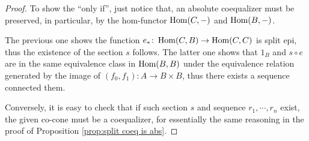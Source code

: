   \begin{proof}
    To show the ``only if'', just notice that, an absolute coequalizer must be preserved, in particular, by the hom-functor $\operatorname{Hom}(C,-)$ and $\operatorname{Hom}(B,-)$.

    The previous one shows the function $e_{\ast}\colon\operatorname{Hom}(C,B)\to\operatorname{Hom}(C,C)$ is split epi, thus the existence of the section $s$ follows. The latter one shows that $1_B$ and $s\circ e$ are in the same equivalence class in $\operatorname{Hom}(B,B)$ under the equivalence relation generated by the image of $(f_0,f_1)\colon A\to B\times B$, thus there exists a sequence connected them.

    Conversely, it is easy to check that if such section $s$ and sequence $r_1,\cdots,r_n$ exist, the given co-cone must be a coequalizer, for essentially the same reasoning in the proof of Proposition \ref{prop:split coeq is abs}.
  \end{proof}

